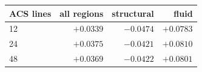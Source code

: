\begin{tabular}{lrrr}
\toprule
ACS lines & all regions & structural & fluid \\
\midrule
12 & $+0.0339$ & $-0.0474$ & $+0.0783$ \\
24 & $+0.0375$ & $-0.0421$ & $+0.0810$ \\
48 & $+0.0369$ & $-0.0422$ & $+0.0801$ \\
\bottomrule
\end{tabular}